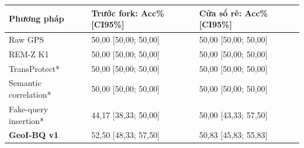 \par\smallskip\noindent\begin{tabularx}{\linewidth}{@{}P{3.2cm}XX@{}}\toprule
\textbf{Phương pháp} & \textbf{Trước fork: Acc\% [CI95\%]} & \textbf{Cửa sổ rẽ: Acc\% [CI95\%]} \\
\midrule
Raw GPS & 50{,}00 [50{,}00; 50{,}00] & 50{,}00 [50{,}00; 50{,}00] \\
REM-Z K1 & 50{,}00 [50{,}00; 50{,}00] & 50{,}00 [50{,}00; 50{,}00] \\
TransProtect* & 50{,}00 [50{,}00; 50{,}00] & 50{,}00 [50{,}00; 50{,}00] \\
Semantic correlation* & 50{,}00 [50{,}00; 50{,}00] & 50{,}00 [50{,}00; 50{,}00] \\
Fake-query insertion* & 44{,}17 [38{,}33; 50{,}00] & 50{,}00 [43{,}33; 57{,}50] \\
\textbf{GeoI-BQ v1} & 52{,}50 [48{,}33; 57{,}50] & 50{,}83 [45{,}83; 55{,}83] \\
\bottomrule\end{tabularx}\par\smallskip
